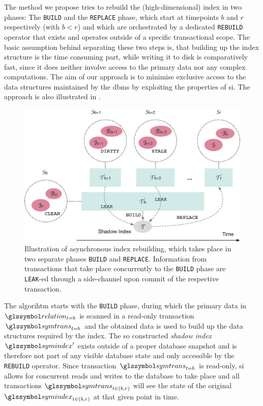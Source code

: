 The method we propose tries to rebuild the (high-dimensional) index in two phases: The \texttt{BUILD} and the \texttt{REPLACE} phase, which start at timepoints $b$ and $r$ respectively (with $b < r$) and which are orchestrated by a dedicated \texttt{REBUILD} operator that exists and operates outside of a specific transactional scope. The basic assumption behind separating these two steps is, that building up the index structure is the time consuming part, while writing it to disk is comparatively fast, since it does neither involve access to the primary data nor any complex computations. The aim of our approach is to minimise exclusive access to the data structures maintained by the \acrshort{dbms} by exploiting the properties of \acrshort{si}. The approach is also illustrated in .


\begin{figure}
    \centering
    \includegraphics[width=\textwidth]{figures/asynchronous-index-rebuilding}
    \caption{Illustration of asynchronous index rebuilding, which takes place in two separate phases \texttt{BUILD} and \texttt{REPLACE}. Information from transactions that take place concurrently to the \texttt{BUILD} phase are \texttt{LEAK}-ed through a side-channel upon commit of the respective transaction.}
    \label{figure:async_index_rebuild}
\end{figure}

The algorihtm starts with the \texttt{BUILD} phase, during which the primary data in $\relation_{t=b}$ is scanned in a read-only transaction $\symtrans_{t=b}$ and the obtained data is used to build up the data structures required by the index. The so constructed \emph{shadow index} $\symindex^{\prime}$ exists outside of a proper database snapshot and is therefore not part of any visible database state and only accessible by the  \texttt{REBUILD} operator. Since transaction $\symtrans_{t=b}$ is read-only, \acrshort{si} allows for concurrent reads and writes to the database to take place and all transactions $\symtrans_{t \in (b, r)}$ will see the state of the original $\symindex_{t \in (b,r)}$ at that given point in time. 

